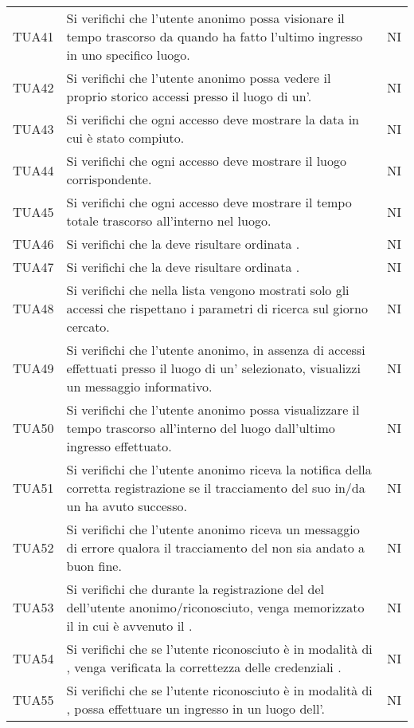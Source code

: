 {\begin{longtable}{ c C{13cm} C{1cm}}
TUA41 & Si verifichi che l’utente anonimo possa visionare il tempo trascorso da quando ha fatto l'ultimo ingresso in uno specifico luogo. & NI \\
TUA42 & Si verifichi che l'utente anonimo possa vedere il proprio storico accessi presso il luogo di un'. & NI \\
TUA43 & Si verifichi che ogni accesso deve mostrare la data in cui è stato compiuto. & NI \\
TUA44 & Si verifichi che ogni accesso deve mostrare il luogo corrispondente. & NI \\
TUA45 & Si verifichi che ogni accesso deve mostrare il tempo totale trascorso all'interno nel luogo. & NI \\
TUA46 & Si verifichi che la  deve risultare ordinata . & NI \\
TUA47 & Si verifichi che la  deve risultare ordinata . & NI \\
TUA48 & Si verifichi che nella lista vengono mostrati solo gli accessi che rispettano i parametri di ricerca sul giorno cercato. & NI \\
TUA49 & Si verifichi che l'utente anonimo, in assenza di accessi effettuati presso il luogo di un' selezionato, visualizzi un messaggio informativo. & NI \\
TUA50 & Si verifichi che l'utente anonimo possa visualizzare il tempo trascorso all'interno del luogo dall'ultimo ingresso effettuato. & NI \\
TUA51 & Si verifichi che l’utente anonimo riceva la notifica della corretta registrazione se il tracciamento del suo  in/da un  ha avuto successo. & NI \\
TUA52 & Si verifichi che l’utente anonimo riceva un messaggio di errore qualora il tracciamento del  non sia andato a buon fine. & NI \\
TUA53 & Si verifichi che durante la registrazione del  del  dell'utente anonimo/riconosciuto, venga memorizzato il  in cui è avvenuto il . & NI \\
TUA54 & Si verifichi che se l'utente riconosciuto è in modalità di , venga verificata la correttezza delle credenziali . & NI \\
TUA55 & Si verifichi che se l'utente riconosciuto è in modalità di , possa effettuare un ingresso in un luogo dell'. & NI \\

\end{longtable}}
